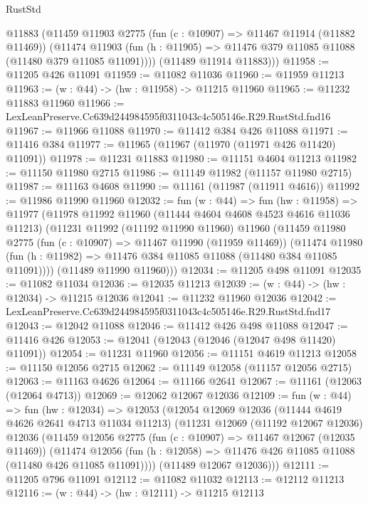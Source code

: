 \begin{lexlean}{RustStd}
\begin{coremodule}
        @11883
        (@11459
          @11903
          @2775
          (fun (c : @10907) => @11467 @11914 (@11882 @11469))
          (@11474
            @11903
            (fun (h : @11905) => @11476 @379 @11085 @11088 (@11480 @379 @11085 @11091))))
        (@11489 @11914 @11883)))
@11958 := @11205 @426 @11091
@11959 := @11082 @11036
@11960 := @11959 @11213
@11963 := (w : @44) -> (hw : @11958) -> @11215 @11960
@11965 := @11232 @11883 @11960
@11966 := LexLeanPreserve.Cc639d244984595f0311043c4c505146e.R29.RustStd.fnd16
@11967 := @11966 @11088
@11970 := @11412 @384 @426 @11088
@11971 := @11416 @384
@11977 := @11965 (@11967 (@11970 (@11971 @426 @11420) @11091))
@11978 := @11231 @11883
@11980 := @11151 @4604 @11213
@11982 := @11150 @11980 @2715
@11986 := @11149 @11982 (@11157 @11980 @2715)
@11987 := @11163 @4608
@11990 := @11161 (@11987 (@11911 @4616))
@11992 := @11986 @11990 @11960
@12032 := fun (w : @44) =>
  fun (hw : @11958) =>
  @11977
    (@11978
      @11992
      @11960
      (@11444 @4604 @4608 @4523 @4616 @11036 @11213)
      (@11231
        @11992
        (@11192 @11990 @11960)
        @11960
        (@11459
          @11980
          @2775
          (fun (c : @10907) => @11467 @11990 (@11959 @11469))
          (@11474
            @11980
            (fun (h : @11982) => @11476 @384 @11085 @11088 (@11480 @384 @11085 @11091))))
        (@11489 @11990 @11960)))
@12034 := @11205 @498 @11091
@12035 := @11082 @11034
@12036 := @12035 @11213
@12039 := (w : @44) -> (hw : @12034) -> @11215 @12036
@12041 := @11232 @11960 @12036
@12042 := LexLeanPreserve.Cc639d244984595f0311043c4c505146e.R29.RustStd.fnd17
@12043 := @12042 @11088
@12046 := @11412 @426 @498 @11088
@12047 := @11416 @426
@12053 := @12041 (@12043 (@12046 (@12047 @498 @11420) @11091))
@12054 := @11231 @11960
@12056 := @11151 @4619 @11213
@12058 := @11150 @12056 @2715
@12062 := @11149 @12058 (@11157 @12056 @2715)
@12063 := @11163 @4626
@12064 := @11166 @2641
@12067 := @11161 (@12063 (@12064 @4713))
@12069 := @12062 @12067 @12036
@12109 := fun (w : @44) =>
  fun (hw : @12034) =>
  @12053
    (@12054
      @12069
      @12036
      (@11444 @4619 @4626 @2641 @4713 @11034 @11213)
      (@11231
        @12069
        (@11192 @12067 @12036)
        @12036
        (@11459
          @12056
          @2775
          (fun (c : @10907) => @11467 @12067 (@12035 @11469))
          (@11474
            @12056
            (fun (h : @12058) => @11476 @426 @11085 @11088 (@11480 @426 @11085 @11091))))
        (@11489 @12067 @12036)))
@12111 := @11205 @796 @11091
@12112 := @11082 @11032
@12113 := @12112 @11213
@12116 := (w : @44) -> (hw : @12111) -> @11215 @12113

\end{coremodule}
\end{lexlean}
